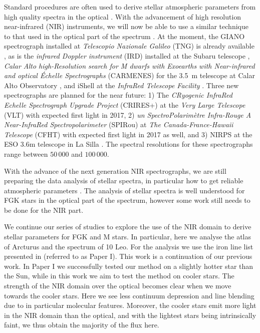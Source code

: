 \documentclass{aa}
\begin{document}
Standard procedures are often used to derive stellar atmospheric parameters from
high quality spectra in the optical \citep[see e.g.][]{Valenti2005,Sousa2008a}.
With the advancement of high resolution near-infrared (NIR) instruments, we will
now be able to use a similar technique to that used in the optical part of the
spectrum \citep[see e.g.][]{Melendez1999,Sousa2008a,Tsantaki2013,Mucciarelli2013,Bensby2014}.
At the moment, the GIANO spectrograph installed at \emph{Telescopio Nazionale
Galileo} (TNG) is already available \citep{GIANO}, as is the \emph{infrared
Doppler instrument} (IRD) installed at the Subaru telescope \citep{IRD},
\emph{Calar Alto high-Resolution search for M dwarfs with Exoearths with
Near-infrared and optical Échelle Spectrographs} (CARMENES) for the \SI{3.5}{m}
telescope at Calar Alto Observatory \citep{CARMENES}, and iShell at the
\emph{InfraRed Telescope Facility} \citep{ishell1,ishell2}. Three new
spectrographs are planned for the near future: 1) The \emph{CRyogenic InfraRed
Echelle Spectrograph Upgrade Project} (CRIRES+) at the \emph{Very Large
Telescope} (VLT) \citep{CRIRESp} with expected first light in 2017, 2) \emph{un
SpectroPolarimètre Infra-Rouge A Near-InfraRed Spectropolarimeter} (SPIRou) at
\emph{The Canada-France-Hawaii Telescope} (CFHT) \citep{SPIROU1,SPIROU2} with
expected first light in 2017 as well, and 3) NIRPS at the ESO 3.6m telescope in
La Silla \citep{NIRPS}. The spectral resolutions for these spectrographs range
between $50\,000$ and $100\,000$.

With the advance of the next generation NIR spectrographs, we are still
preparing the data analysis of stellar spectra, in particular how to get
reliable atmospheric parameters \citep[see e.g.][]{Onehag2012,Lindgren2016,Andreasen2016}.
The analysis of stellar spectra is well understood for FGK stars in the optical
part of the spectrum, however some work still needs to be done for the NIR part.

We continue our series of studies to explore the use of the NIR domain to derive
stellar parameters for FGK and M stars. In particular, here we analyse the atlas
of Arcturus and the spectrum of 10 Leo. For the analysis we use the iron line
list presented in \citet{Andreasen2016} (referred to as Paper I). This work is a
continuation of our previous work. In Paper I we successfully tested our method
on a slightly hotter star than the Sun, while in this work we aim to test the
method on cooler stars. The strength of the NIR domain over the optical becomes
clear when we move towards the cooler stars. Here we see less continuum
depression and line blending due to in particular molecular features. Moreover,
the cooler stars emit more light in the NIR domain than the optical, and with
the lightest stars being intrinsically faint, we thus obtain the majority of the
flux here.
\end{document}
